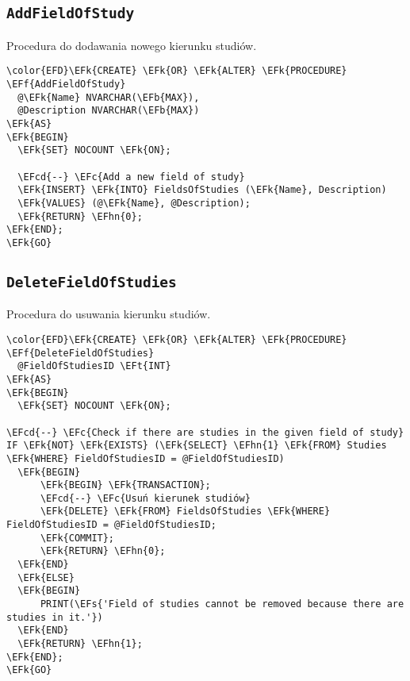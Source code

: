 \documentclass[11pt]{article}
\newcommand{\EFc}[1]{\textcolor{EFc}{\textit{#1}}} %
\newcommand{\EFcd}[1]{\textcolor{EFcd}{\textit{#1}}} %
\newcommand{\EFs}[1]{\textcolor{EFs}{#1}} %
\newcommand{\EFk}[1]{\textcolor{EFk}{\textbf{#1}}} %
\newcommand{\EFb}[1]{\textcolor{EFb}{\textbf{#1}}} %
\newcommand{\EFf}[1]{\textcolor{EFf}{#1}} %
\newcommand{\EFt}[1]{\textcolor{EFt}{\textbf{#1}}} %
\newcommand{\EFhn}[1]{\textcolor{EFhn}{#1}} %
\begin{document}
\subsection{\texttt{AddFieldOfStudy}}
\label{sec:orgdefd561}
Procedura do dodawania nowego kierunku studiów.
\begin{Code}
\begin{Verbatim}
\color{EFD}\EFk{CREATE} \EFk{OR} \EFk{ALTER} \EFk{PROCEDURE} \EFf{AddFieldOfStudy}
  @\EFk{Name} NVARCHAR(\EFb{MAX}),
  @Description NVARCHAR(\EFb{MAX})
\EFk{AS}
\EFk{BEGIN}
  \EFk{SET} NOCOUNT \EFk{ON};

  \EFcd{--} \EFc{Add a new field of study}
  \EFk{INSERT} \EFk{INTO} FieldsOfStudies (\EFk{Name}, Description)
  \EFk{VALUES} (@\EFk{Name}, @Description);
  \EFk{RETURN} \EFhn{0};
\EFk{END};
\EFk{GO}
\end{Verbatim}
\end{Code}
\subsection{\texttt{DeleteFieldOfStudies}}
\label{sec:orgf003b53}
Procedura do usuwania kierunku studiów.
\begin{Code}
\begin{Verbatim}
\color{EFD}\EFk{CREATE} \EFk{OR} \EFk{ALTER} \EFk{PROCEDURE} \EFf{DeleteFieldOfStudies}
  @FieldOfStudiesID \EFt{INT}
\EFk{AS}
\EFk{BEGIN}
  \EFk{SET} NOCOUNT \EFk{ON};

\EFcd{--} \EFc{Check if there are studies in the given field of study}
IF \EFk{NOT} \EFk{EXISTS} (\EFk{SELECT} \EFhn{1} \EFk{FROM} Studies \EFk{WHERE} FieldOfStudiesID = @FieldOfStudiesID)
  \EFk{BEGIN}
      \EFk{BEGIN} \EFk{TRANSACTION};
      \EFcd{--} \EFc{Usuń kierunek studiów}
      \EFk{DELETE} \EFk{FROM} FieldsOfStudies \EFk{WHERE} FieldOfStudiesID = @FieldOfStudiesID;
      \EFk{COMMIT};
      \EFk{RETURN} \EFhn{0};
  \EFk{END}
  \EFk{ELSE}
  \EFk{BEGIN}
      PRINT(\EFs{'Field of studies cannot be removed because there are studies in it.'})
  \EFk{END}
  \EFk{RETURN} \EFhn{1};
\EFk{END};
\EFk{GO}
\end{Verbatim}
\end{Code}
\end{document}
